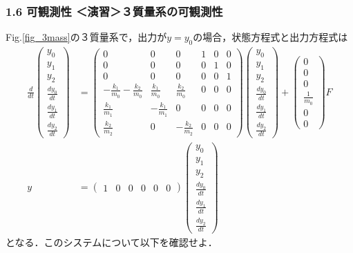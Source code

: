 \documentclass[10pt]{beamer}
\begin{document}
\begin{frame}[t]
\frametitle{1.6 可観測性 ＜演習＞３質量系の可観測性}
Fig.\ref{fig_3mass}の３質量系で，出力が$y=y_0$の場合，状態方程式と出力方程式は
\small{
\begin{align}
 \frac{d}{dt} \left(\begin{array}{c}
           y_0 \\
         y_1 \\
         y_2 \\
         \frac{dy_0}{dt} \\
         \frac{dy_1}{dt} \\
         \frac{dy_2}{dt}
        \end{array}\right)
 &=
 \left(\begin{array}{cccccc}
        0 & 0 & 0 & 1 & 0 & 0      \\
        0 & 0 & 0 & 0 & 1 & 0      \\
        0 & 0 & 0 & 0 & 0 & 1      \\
  -\frac{k_1}{m_0} -\frac{k_2}{m_0}&  \frac{k_1}{m_0} &  \frac{k_2}{m_0} & 0 & 0 & 0 \\
   \frac{k_1}{m_1}                & -\frac{k_1}{m_1} &  0               & 0 & 0 & 0 \\
   \frac{k_2}{m_2}                &  0               & -\frac{k_2}{m_2} & 0 & 0 & 0
       \end{array}\right)
 \left(\begin{array}{c}
           y_0 \\
         y_1 \\
         y_2 \\
         \frac{dy_0}{dt} \\
         \frac{dy_1}{dt} \\
         \frac{dy_2}{dt}
       \end{array}\right)
 +
 \left(\begin{array}{c}
        0 \\
        0 \\
        0 \\
      \frac{1}{m_0} \\
      0 \\
      0
       \end{array}\right)
        F
\nonumber
\\
y &=
 \left(\begin{array}{cccccc}
         1 & 0 & 0 & 0 & 0 & 0
       \end{array}\right)
 \left(\begin{array}{c}
           y_0 \\
         y_1 \\
         y_2 \\
         \frac{dy_0}{dt} \\
         \frac{dy_1}{dt} \\
         \frac{dy_2}{dt}
       \end{array}\right)
\nonumber
\end{align}
}
となる．このシステムについて以下を確認せよ．


\end{frame}
\end{document}

